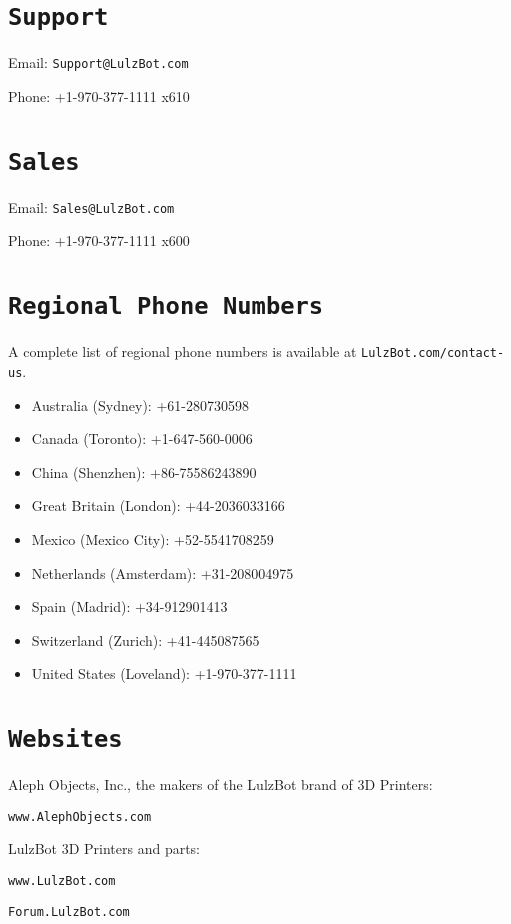 %
%
%
%
%

\section{\texttt{Support}}
\setlength{\parindent}{0pt}
Email: \texttt{Support@LulzBot.com}

Phone: +1-970-377-1111 x610

\section{\texttt{Sales}}

Email: \texttt{Sales@LulzBot.com}

Phone: +1-970-377-1111 x600

\section{\texttt{Regional Phone Numbers}}\label{regional-phone-numbers}
A complete list of regional phone numbers is available at \texttt{LulzBot.com/contact-us}. 
\begin{itemize}
\item Australia﻿ (Sydney﻿): +61-280730598
\item Canada (Toronto): +1-647-560-0006
\item China (Shenzhen): +86-75586243890
\item Great Britain (London﻿)﻿: +44-2036033166﻿
\item Mexico (Mexico City﻿)﻿: +52-5541708259
\item Netherlands (Amsterdam﻿)﻿: +31-208004975
\item Spain﻿ (Madrid﻿): +34-912901413﻿
\item Switzerland﻿ (Zurich﻿)﻿: +41-445087565
\item United States (Loveland): +1-970-377-1111
\end{itemize}

\section{\texttt{Websites}}

Aleph Objects, Inc., the makers of the LulzBot\textsuperscript{\miniscule{\textregistered}} brand of 3D Printers:

\texttt{www.AlephObjects.com}


LulzBot 3D Printers and parts:

\texttt{www.LulzBot.com}

\texttt{Forum.LulzBot.com}
